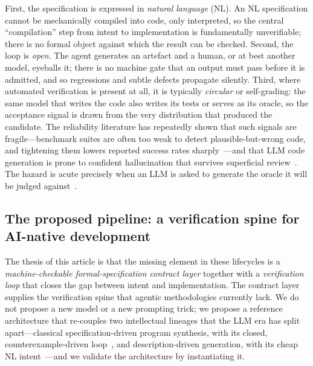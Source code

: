 First, the specification is expressed in \emph{natural language} (NL). An NL specification cannot be mechanically compiled into code, only interpreted, so the central ``compilation'' step from intent to implementation is fundamentally unverifiable; there is no formal object against which the result can be checked. Second, the loop is \emph{open}. The agent generates an artefact and a human, or at best another model, eyeballs it; there is no machine gate that an output must pass before it is admitted, and so regressions and subtle defects propagate silently. Third, where automated verification is present at all, it is typically \emph{circular} or self-grading: the same model that writes the code also writes its tests or serves as its oracle, so the acceptance signal is drawn from the very distribution that produced the candidate. The reliability literature has repeatedly shown that such signals are fragile---benchmark suites are often too weak to detect plausible-but-wrong code, and tightening them lowers reported success rates sharply~\cite{liu2023evalplus}---and that LLM code generation is prone to confident hallucination that survives superficial review~\cite{zhang2025hallucination}. The hazard is acute precisely when an LLM is asked to generate the oracle it will be judged against~\cite{liu2026oracle}.

\subsection{The proposed pipeline: a verification spine for AI-native development}
\label{subsec:intro-proposal}

The thesis of this article is that the missing element in these lifecycles is a \emph{machine-checkable formal-specification contract layer} together with a \emph{verification loop} that closes the gap between intent and implementation. The contract layer supplies the verification spine that agentic methodologies currently lack. We do not propose a new model or a new prompting trick; we propose a reference architecture that re-couples two intellectual lineages that the LLM era has split apart---classical specification-driven program synthesis, with its closed, counterexample-driven loop~\cite{manna1980deductive,solarlezama2008sketching}, and description-driven generation, with its cheap NL intent~\cite{chen2021codex,jimenez2024swebench}---and we validate the architecture by instantiating it.

